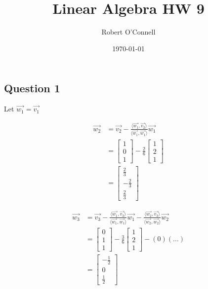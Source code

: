 \documentclass{article}
\title{\textbf{Linear Algebra HW 9}}
\author{Robert O'Connell}
\date{\today}
\begin{document}
\maketitle
\vspace{5mm}
\subsection*{Question 1}
Let \(\vec{w_1} = \vec{v_1}\)

\begin{align*}
    \vec{w_2} &= \vec{v_2} - \frac{\langle \vec{w_1}, \vec{v_2} \rangle}{\langle \vec{w_1}, \vec{w_1} \rangle} \vec{w_1} \\
    &= \begin{bmatrix}
        1 \\ 0 \\ 1 
    \end{bmatrix} - \frac{2}{6} \begin{bmatrix}
        1 \\ 2 \\ 1 
    \end{bmatrix} \\
    &= \begin{bmatrix}
        \frac{2}{3} \\ -\frac{2}{3} \\ \frac{2}{3}
    \end{bmatrix}
\end{align*}

\begin{align*}
\vec{w_3} &= \vec{v_3} -  \frac{\langle \vec{w_1}, \vec{v_3} \rangle}{\langle \vec{w_1}, \vec{w_1} \rangle} \vec{w_1} -  \frac{\langle \vec{w_2}, \vec{v_3} \rangle}{\langle \vec{w_2}, \vec{w_2} \rangle} \vec{w_2} \\
&= \begin{bmatrix}
    0 \\ 1 \\ 1
\end{bmatrix} - \frac{3}{6}\begin{bmatrix}
    1 \\ 2 \\ 1
\end{bmatrix} - (0)(\dots) \\
&= \begin{bmatrix}
    -\frac{1}{2} \\ 0 \\ \frac{1}{2}
\end{bmatrix}
\end{align*}
\end{document}
